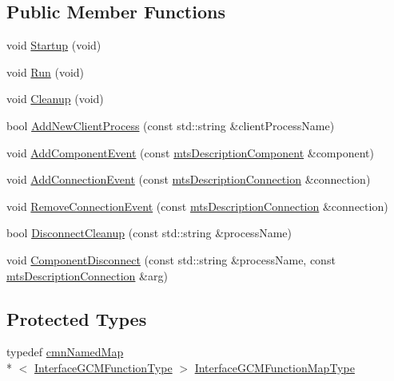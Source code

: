 \subsection*{Public Member Functions}
\begin{DoxyCompactItemize}
\item 
void \hyperlink{classmts_manager_component_server_ab4a7ff516bbe04b439039a2342e48455}{Startup} (void)
\item 
void \hyperlink{classmts_manager_component_server_a18c682506c92fd6e0523e3925f1e637b}{Run} (void)
\item 
void \hyperlink{classmts_manager_component_server_a3cd58f066e7023e2bc000232b178ee55}{Cleanup} (void)
\item 
bool \hyperlink{classmts_manager_component_server_a89c2c3df2989610b4ae2fecb70d3184f}{Add\-New\-Client\-Process} (const std\-::string \&client\-Process\-Name)
\item 
void \hyperlink{classmts_manager_component_server_a51717169473ba879ea40f671dd5f5d27}{Add\-Component\-Event} (const \hyperlink{classmts_description_component}{mts\-Description\-Component} \&component)
\item 
void \hyperlink{classmts_manager_component_server_a8db723af6b218fa2a0c648664d06da1f}{Add\-Connection\-Event} (const \hyperlink{classmts_description_connection}{mts\-Description\-Connection} \&connection)
\item 
void \hyperlink{classmts_manager_component_server_a77c2a4abdf23b89b842615fa50c0cf3c}{Remove\-Connection\-Event} (const \hyperlink{classmts_description_connection}{mts\-Description\-Connection} \&connection)
\item 
bool \hyperlink{classmts_manager_component_server_a033499e692bea2a893927d637841c1c4}{Disconnect\-Cleanup} (const std\-::string \&process\-Name)
\item 
void \hyperlink{classmts_manager_component_server_a1dcd5082d9a306e6a47b1b22aec218f3}{Component\-Disconnect} (const std\-::string \&process\-Name, const \hyperlink{classmts_description_connection}{mts\-Description\-Connection} \&arg)
\end{DoxyCompactItemize}
\subsection*{Protected Types}
\begin{DoxyCompactItemize}
\item 
typedef \hyperlink{classcmn_named_map}{cmn\-Named\-Map}\\*
$<$ \hyperlink{structmts_manager_component_server_1_1_interface_g_c_m_function_type}{Interface\-G\-C\-M\-Function\-Type} $>$ \hyperlink{classmts_manager_component_server_a9b456473c566d9993274d3de0f124f7c}{Interface\-G\-C\-M\-Function\-Map\-Type}
\end{DoxyCompactItemize}

